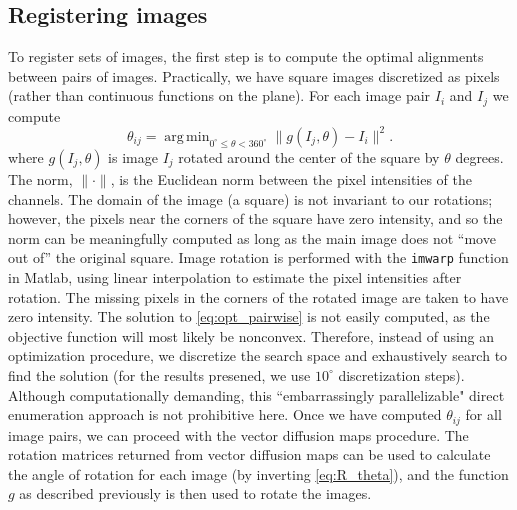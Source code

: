 \documentclass{pnastwo}
\DeclareMathOperator*{\argmin}{arg\,min}
\begin{document}
\begin{article}
\subsection{Registering images} \label{subsec:trans_rot_register}

To register sets of images, 
the first step is to compute the optimal alignments between pairs of images.
%
Practically, we have square images discretized as pixels (rather than continuous functions on the plane).
%
For each image pair $I_i$ and $I_j$ we compute
\begin{equation}\label{eq:opt_pairwise}
\theta_{ij} = \argmin_{
0^\circ \le \theta < 360^\circ }
 \|g(I_j, \theta) - I_i \|^2.
\end{equation}
where $g(I_j, \theta)$ is image $I_j$ rotated around the center of the square by $\theta$ degrees.
%
The norm, $\| \cdot \|$, is the Euclidean norm between the pixel intensities of the channels.
%
The domain of the image (a square) is not invariant to our rotations; however, the pixels near the corners of the square have zero intensity, and so the norm can be meaningfully computed as long as the main image does not ``move out of'' the original square.
%
Image rotation is performed with the \texttt{imwarp} function in Matlab, using linear interpolation to estimate the pixel intensities after rotation.
%
The missing pixels in the corners of the rotated image are taken to have zero intensity.
%
The solution to \eqref{eq:opt_pairwise} is not easily computed, as the objective function will most likely be nonconvex.
%
Therefore, instead of using an optimization procedure, we discretize the search space and exhaustively search to find the solution (for the results presened, we use $10^\circ$ discretization steps).
%
%
%
Although computationally demanding, this ``embarrassingly parallelizable" direct enumeration approach is not prohibitive here.
%
Once we have computed $\theta_{ij}$ for all image pairs, we can proceed with the vector diffusion maps procedure.
%
The rotation matrices returned from vector diffusion maps can be used to calculate the angle of rotation for each image (by inverting \eqref{eq:R_theta}), and the function $g$ as described previously is then used to rotate the images.


\end{article}
\end{document}

